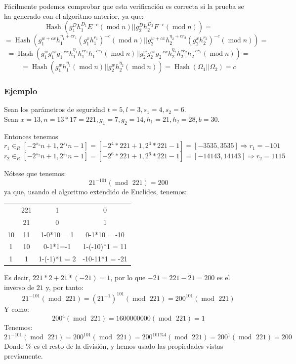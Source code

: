 Fácilmente podemos comprobar que esta verificación es correcta si la prueba se ha generado con el algoritmo anterior, ya que:
$$\operatorname{Hash}(g_{1}^{D}h_{1}^{D_{1}}E^{-c} (\operatorname{mod} n) || g_{2}^{D}h_{2}^{D_{2}}F^{-c} (\operatorname{mod} n)) =$$
$$= \operatorname{Hash}(g_{1}^{w + cx}h_{1}^{\eta_{1} + cr_{1}}(g_{1}^{x}h_{1}^{r_{1}})^{-c} (\operatorname{mod} n) || g_{2}^{w + cx}h_{2}^{\eta_{2} + cr_{2}}(g_{2}^{x}h_{2}^{r_{2}})^{-c} (\operatorname{mod} n)) =$$
$$= \operatorname{Hash}(g_{1}^{w}g_{1}^{cx}g_{1}^{-cx}h_{1}^{\eta_{1}}h_{1}^{cr_{1}}h_{1}^{-cr_{1}} (\operatorname{mod} n) || g_{2}^{w}g_{2}^{cx}g_{2}^{-cx}h_{2}^{\eta_{2}}h_{2}^{cr_{2}}h_{2}^{-cr_{2}} (\operatorname{mod} n)) =$$
$$= \operatorname{Hash}(g_{1}^{w}h_{1}^{\eta_{1}} (\operatorname{mod} n) || g_{2}^{w}h_{2}^{\eta_{2}} (\operatorname{mod} n)) = \operatorname{Hash}(\Omega_{1} || \Omega_{2}) = c$$

\subsubsection{Ejemplo}

Sean los parámetros de seguridad $t = 5, l = 3, s_{1} = 4, s_{2} = 6$. \\ Sean $x = 13, n = 13 * 17 = 221, g_{1} = 7, g_{2} = 14, h_{1} = 21, h_{2} = 28, b = 30$.

Entonces tenemos
$$r_{1} \in_{R} [-2^{s_{1}}n+1, 2^{s_{1}}n-1] = [-2^{4}*221+1, 2^{4}*221-1] = [-3535, 3535] \Rightarrow r_{1} = -101$$
$$r_{2} \in_{R} [-2^{s_{2}}n+1, 2^{s_{2}}n-1] = [-2^{6}*221+1, 2^{6}*221-1] = [-14143, 14143] \Rightarrow r_{2} = 1115$$

Nótese que tenemos:
$$21^{-101} (\operatorname{mod} \text{ 221}) = 200$$
ya que, usando el algoritmo extendido de Euclídes, tenemos:
\begin{table}[H]
        \centering
        \begin{tabular}{c c|c c}
                & 221 & 1            & 0 \\
                & 21  & 0            & 1 \\
             10 & 11  & 1-0*10 = 1   & 0-1*10 = -10 \\
             1  & 10  & 0-1*1=-1     & 1-(-10)*1 = 11 \\
             1  & 1   & 1-(-1)*1 = 2 & -10-11*1 = -21
        \end{tabular}
    \end{table}
Es decir, $221 * 2 + 21 * (-21) = 1$, por lo que $-21 = 221 - 21 = 200$ es el inverso de $21$ y, por tanto:
$$21^{-101} (\operatorname{mod} \text{ 221}) = (21^{-1})^{101} (\operatorname{mod} \text{ 221}) = 200^{101} (\operatorname{mod} \text{ 221})$$
Y como:
$$200^{4} (\operatorname{mod} \text{ 221}) = 1600000000 (\operatorname{mod} \text{ 221}) = 1$$
Tenemos:
$$21^{-101} (\operatorname{mod} \text{ 221}) = 200^{101} (\operatorname{mod} \text{ 221}) = 200^{101 \% 4} (\operatorname{mod} \text{ 221}) = 200^{1} (\operatorname{mod} \text{ 221}) = 200$$
Donde $\%$ es el resto de la división, y hemos usado las propiedades vistas previamente.

